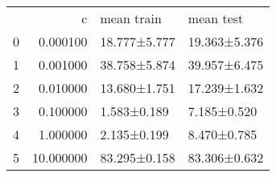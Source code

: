 \begin{tabular}{lrll}
 & c & mean train & mean test \\
0 & 0.000100 & 18.777±5.777 & 19.363±5.376 \\
1 & 0.001000 & 38.758±5.874 & 39.957±6.475 \\
2 & 0.010000 & 13.680±1.751 & 17.239±1.632 \\
3 & 0.100000 & 1.583±0.189 & 7.185±0.520 \\
4 & 1.000000 & 2.135±0.199 & 8.470±0.785 \\
5 & 10.000000 & 83.295±0.158 & 83.306±0.632 \\
\end{tabular}
